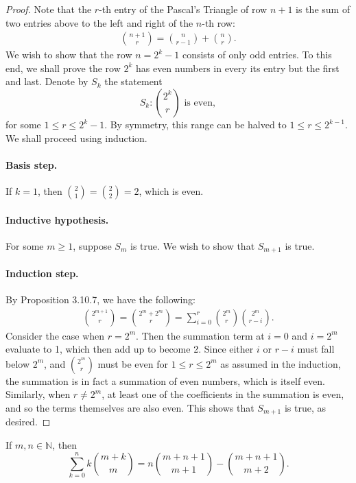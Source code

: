 \documentclass{exam}
\begin{document}
\begin{proof}
    Note that the $r$-th entry of the Pascal's Triangle of row $n+1$ is the sum of two entries above to the left and right of the $n$-th row:
    \begin{align*}
        \binom{n+1}{r}=\binom{n}{r-1}+\binom{n}{r}.
    \end{align*}
    We wish to show that the row $n = 2^k-1$ consists of only odd entries. To this end, we shall prove the row $2^k$ has even numbers in every its entry but the first and last. Denote by $S_k$ the statement $$S_k: \binom{2^k}r \text{ is even},$$ for some $1\le r\le 2^k-1$. By symmetry, this range can be halved to $1\le r\le 2^{k-1}$. We shall proceed using induction.

    \paragraph{Basis step.} If $k=1$, then $\binom21 =\binom22 = 2$, which is even.

    \paragraph{Inductive hypothesis.} For some $m\ge 1$, suppose $S_m$ is true. We wish to show that $S_{m+1}$ is true.

    \paragraph{Induction step.} By Proposition 3.10.7, we have the following:
    \begin{align*}
        \binom{2^{m+1}}r = \binom{2^m+2^m}r = \sum_{i=0}^r\binom{2^m}r\binom{2^m}{r-i}.
    \end{align*}
    Consider the case when $r = 2^m$. Then the summation term at $i = 0$ and $i = 2^m$ evaluate to 1, which then add up to become 2. Since either $i$ or $r-i$ must fall below $2^m$, and $\binom{2^m}{r}$ must be even for $1\le r\le2^m$ as assumed in the induction, the summation is in fact a summation of even numbers, which is itself even. Similarly, when $r\neq2^m$, at least one of the coefficients in the summation is even, and so the terms themselves are also even. This shows that $S_{m+1}$ is true, as desired.
\end{proof}

\begin{proposition}{10.37}
    If $m,n\in\mathbb N$, then $$\sum_{k=0}^nk\binom{m+k}m=n\binom{m+n+1}{m+1}-\binom{m+n+1}{m+2}.$$
\end{proposition}
\end{document}
